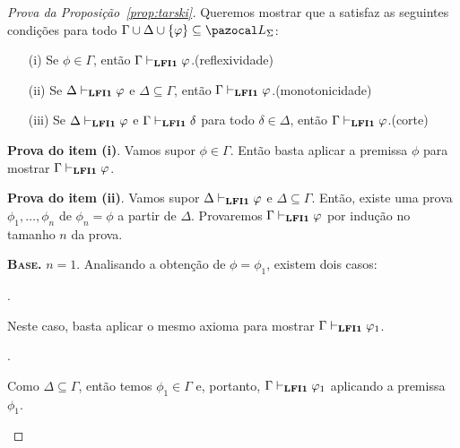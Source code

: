         \begin{proof}[Prova da Proposição~\ref{prop:tarski}]
            Queremos mostrar que a \lfium{} satisfaz as seguintes condições para todo $\Gamma \cup \Delta \cup \{\phi\} \subseteq \ling{}$:
            \begin{itemize}
                \item [(i)] Se $\phi \in \Gamma$, então $\Gamma \vdash_{{\normalfont\textbf{LFI1}}{}} \varphi$.\hfill(reflexividade)
                \item [(ii)] Se $\Delta \vdash_{{\normalfont\textbf{LFI1}}{}} \varphi$ e $\Delta \subseteq \Gamma$, então $\Gamma \vdash_{{\normalfont\textbf{LFI1}}{}} \varphi$.\hfill(monotonicidade)
                \item [(iii)] Se $\Delta \vdash_{{\normalfont\textbf{LFI1}}{}} \varphi$ e $\Gamma \vdash_{{\normalfont\textbf{LFI1}}{}} \delta$ para todo $\delta \in \Delta$, então $\Gamma \vdash_{{\normalfont\textbf{LFI1}}{}} \varphi$.\hfill(corte)
            \end{itemize}
            \begin{adjustwidth}{1cm}{}
                \textbf{Prova do item (i)}. Vamos supor $\phi \in \Gamma$. Então basta aplicar a premissa $\phi$ para mostrar $\Gamma \vdash_{{\normalfont\textbf{LFI1}}{}} \varphi$.

                \noindent{}\textbf{Prova do item (ii)}. Vamos supor $\Delta \vdash_{{\normalfont\textbf{LFI1}}{}} \varphi$ e $\Delta \subseteq \Gamma$. Então, existe uma prova $\phi_1, \ldots, \phi_n$ de $\phi_n = \phi$ a partir de $\Delta$. Provaremos $\Gamma \vdash_{{\normalfont\textbf{LFI1}}{}} \varphi$ por indução no tamanho $n$ da prova.

                \begin{adjustwidth}{1cm}{}

                    \textbf{\textsc{Base.}} $n = 1$.
                    Analisando a obtenção de $\phi = \phi_1$, existem dois casos:

                    \begin{provaporcasos}

                    . 

                        Neste caso, basta aplicar o mesmo axioma para mostrar $\Gamma \vdash_{{\normalfont\textbf{LFI1}}{}} \varphi_1$.

                    \casodeprova{$\phi_1 \in \Delta$}.

                        Como $\Delta \subseteq \Gamma$, então temos $\phi_1 \in \Gamma$ e, portanto, $\Gamma \vdash_{{\normalfont\textbf{LFI1}}{}} \varphi_1$ aplicando a premissa $\phi_1$.
                        

\end{provaporcasos}
\end{adjustwidth}
\end{adjustwidth}
\end{proof}
